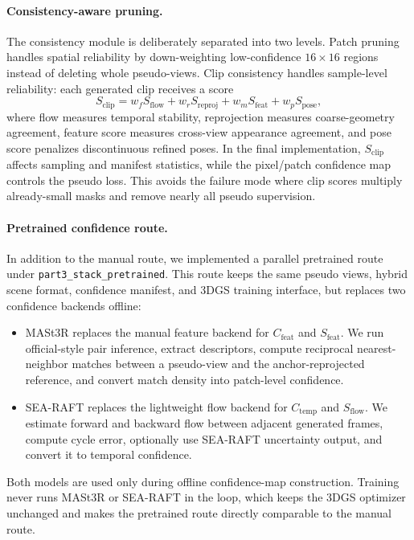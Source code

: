 \documentclass[10pt,twocolumn,letterpaper]{article}
\begin{document}
\paragraph{Consistency-aware pruning.}
The consistency module is deliberately separated into two levels.  Patch pruning handles spatial reliability by down-weighting low-confidence $16\times16$ regions instead of deleting whole pseudo-views.  Clip consistency handles sample-level reliability: each generated clip receives a score
\begin{equation}
S_{\mathrm{clip}} =
w_fS_{\mathrm{flow}} + w_rS_{\mathrm{reproj}} + w_mS_{\mathrm{feat}} + w_pS_{\mathrm{pose}},
\end{equation}
where flow measures temporal stability, reprojection measures coarse-geometry agreement, feature score measures cross-view appearance agreement, and pose score penalizes discontinuous refined poses.  In the final implementation, $S_{\mathrm{clip}}$ affects sampling and manifest statistics, while the pixel/patch confidence map controls the pseudo loss.  This avoids the failure mode where clip scores multiply already-small masks and remove nearly all pseudo supervision.

\paragraph{Pretrained confidence route.}
In addition to the manual route, we implemented a parallel pretrained route under \texttt{part3\_stack\_pretrained}.  This route keeps the same pseudo views, hybrid scene format, confidence manifest, and 3DGS training interface, but replaces two confidence backends offline:
\begin{itemize}
  \item MASt3R replaces the manual feature backend for $C_{\mathrm{feat}}$ and $S_{\mathrm{feat}}$.  We run official-style pair inference, extract descriptors, compute reciprocal nearest-neighbor matches between a pseudo-view and the anchor-reprojected reference, and convert match density into patch-level confidence.
  \item SEA-RAFT replaces the lightweight flow backend for $C_{\mathrm{temp}}$ and $S_{\mathrm{flow}}$.  We estimate forward and backward flow between adjacent generated frames, compute cycle error, optionally use SEA-RAFT uncertainty output, and convert it to temporal confidence.
\end{itemize}
Both models are used only during offline confidence-map construction.  Training never runs MASt3R or SEA-RAFT in the loop, which keeps the 3DGS optimizer unchanged and makes the pretrained route directly comparable to the manual route.
\end{document}
